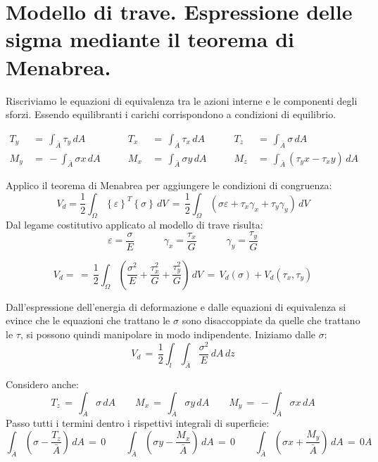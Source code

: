 \section{Modello di trave. Espressione delle sigma mediante il teorema di Menabrea.}

Riscriviamo le equazioni di equivalenza tra le azioni interne e le componenti degli sforzi. Essendo equilibranti i carichi corrispondono a condizioni di equilibrio.

\begin{align*}
    T_y \, &=\, \int_{\bar{A}} \tau_y \, dA 
    &\quad\quad T_x \, &=\, \int_{\bar{A}} \tau_x \, dA 
    &\quad\quad T_z \, &=\, \int_{\bar{A}} \sigma \, dA \\
    M_y \, &=\, - \int_{\bar{A}} \sigma x \, dA 
    &\quad\quad M_x \, &=\,  \int_{\bar{A}} \sigma y \, dA 
    &\quad\quad M_z \, &=\, \int_{\bar{A}} ( \tau_y x - \tau_x y ) \, dA
\end{align*}

Applico il teorema di Menabrea per aggiungere le condizioni di congruenza:
\begin{equation*}
    V_d = \frac{1}{2} \int_\Omega  \left\{\varepsilon\right\}^T \left\{\sigma\right\}\, dV \,=\, \frac{1}{2} \int_\Omega  \left(  \sigma\varepsilon + \tau_x\gamma_x + \tau_y\gamma_y \right)\,dV
\end{equation*}
Dal legame costitutivo applicato al modello di trave risulta:
\begin{equation*}
    \varepsilon = \frac{\sigma}{E} \quad \quad \quad \gamma_x = \frac{\tau_x}{G} \quad \quad \quad \gamma_y = \frac{\tau_y}{G} 
\end{equation*}

\begin{equation*}
    V_d = \,=\, \frac{1}{2} \int_\Omega  \left(  \frac{\sigma^2}{E} +  \frac{\tau_x^2}{G}  +\frac{\tau_y^2}{G}  \right)\,dV 
   \, =\, V_d(\sigma) + V_d(\tau_x,\tau_y)
\end{equation*}

Dall'espressione dell'energia di deformazione e dalle equazioni di equivalenza si evince che le equazioni che trattano le $\sigma$ sono disaccoppiate da quelle che trattano le $\tau$, si possono quindi manipolare in modo indipendente. Iniziamo dalle $\sigma$:
\begin{equation*}
    V_d  \,=\, \frac{1}{2} \int_l  \int_{\bar{A}}   \frac{\sigma^2}{E} \,dA\,dz
\end{equation*}


Considero anche:
\begin{equation*}
     T_z \, =\, \int_{\bar{A}} \sigma \, dA \quad\quad M_x \, =\,  \int_{\bar{A}} \sigma y \, dA\quad\quad M_y \, =\, - \int_{\bar{A}} \sigma x \, dA
\end{equation*}
Passo tutti i termini dentro i rispettivi integrali di superficie:
\begin{equation*}
      \int_{\bar{A}} \left(\sigma-\frac{T_z}{\bar{A}}\right) \, dA\, =\, 0 \quad\quad
      \int_{\bar{A}} \left(\sigma y-\frac{M_x}{\bar{A}}\right) \, dA\, =\, 0\quad\quad 
      \int_{\bar{A}} \left(\sigma x+\frac{M_y}{\bar{A}}\right) \, dA\, =\, 0A
\end{equation*}


